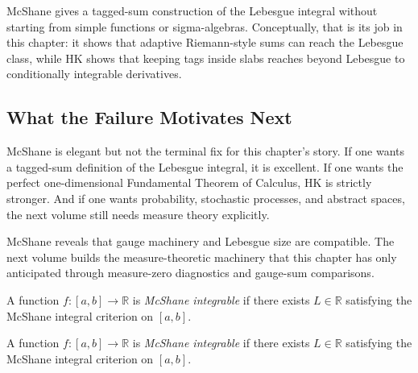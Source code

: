 \begin{remark*}[Interpretation]
McShane gives a tagged-sum construction of the Lebesgue integral without
starting from simple functions or sigma-algebras. Conceptually, that is its
job in this chapter: it shows that adaptive Riemann-style sums can reach the
Lebesgue class, while HK shows that keeping tags inside slabs reaches beyond
Lebesgue to conditionally integrable derivatives.
\end{remark*}

\subsection*{What the Failure Motivates Next}

\begin{remark*}[Interpretation]
McShane is elegant but not the terminal fix for this chapter's story. If one
wants a tagged-sum definition of the Lebesgue integral, it is excellent. If
one wants the perfect one-dimensional Fundamental Theorem of Calculus, HK is
strictly stronger. And if one wants probability, stochastic processes, and
abstract spaces, the next volume still needs measure theory explicitly.
\end{remark*}

\begin{remark*}[Interpretation]
McShane reveals that gauge machinery and Lebesgue size are compatible. The
next volume builds the measure-theoretic machinery that this chapter has only
anticipated through measure-zero diagnostics and gauge-sum comparisons.
\end{remark*}

\begin{definition}
\label{def:is-mc-shane-integrable}
A function $f:[a,b]\to\mathbb R$ is \emph{McShane integrable} if there exists $L\in\mathbb R$ satisfying the McShane integral criterion on $[a,b]$.
\end{definition}

\begin{remark*}
A function $f:[a,b]\to\mathbb R$ is \emph{McShane integrable} if there exists $L\in\mathbb R$ satisfying the McShane integral criterion on $[a,b]$.
\end{remark*}

